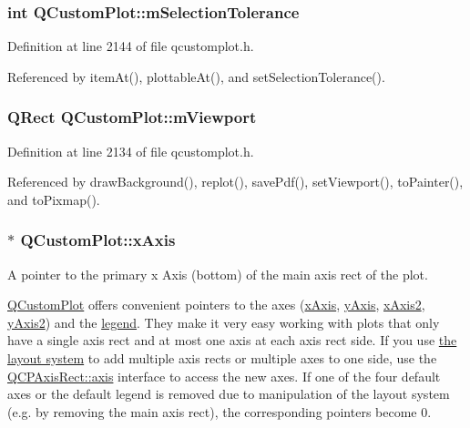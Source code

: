 \subsubsection[{m\+Selection\+Tolerance}]{\setlength{\rightskip}{0pt plus 5cm}int Q\+Custom\+Plot\+::m\+Selection\+Tolerance\hspace{0.3cm}{\ttfamily [protected]}}\label{class_q_custom_plot_abc36e12dd0482117ad810a800c847722}


Definition at line 2144 of file qcustomplot.\+h.



Referenced by item\+At(), plottable\+At(), and set\+Selection\+Tolerance().

\hypertarget{class_q_custom_plot_ac0a7c38a715526c257cff95774f83ab6}{}
\subsubsection[{m\+Viewport}]{\setlength{\rightskip}{0pt plus 5cm}Q\+Rect Q\+Custom\+Plot\+::m\+Viewport\hspace{0.3cm}{\ttfamily [protected]}}\label{class_q_custom_plot_ac0a7c38a715526c257cff95774f83ab6}


Definition at line 2134 of file qcustomplot.\+h.



Referenced by draw\+Background(), replot(), save\+Pdf(), set\+Viewport(), to\+Painter(), and to\+Pixmap().

\hypertarget{class_q_custom_plot_a9a79cd0158a4c7f30cbc702f0fd800e4}{}
\subsubsection[{x\+Axis}]{ $\ast$ Q\+Custom\+Plot\+::x\+Axis}\label{class_q_custom_plot_a9a79cd0158a4c7f30cbc702f0fd800e4}
A pointer to the primary x Axis (bottom) of the main axis rect of the plot.

\hyperlink{class_q_custom_plot}{Q\+Custom\+Plot} offers convenient pointers to the axes (\hyperlink{class_q_custom_plot_a9a79cd0158a4c7f30cbc702f0fd800e4}{x\+Axis}, \hyperlink{class_q_custom_plot_af6fea5679725b152c14facd920b19367}{y\+Axis}, \hyperlink{class_q_custom_plot_ada41599f22cad901c030f3dcbdd82fd9}{x\+Axis2}, \hyperlink{class_q_custom_plot_af13fdc5bce7d0fabd640f13ba805c0b7}{y\+Axis2}) and the \hyperlink{class_q_custom_plot_a4eadcd237dc6a09938b68b16877fa6af}{legend}. They make it very easy working with plots that only have a single axis rect and at most one axis at each axis rect side. If you use \hyperlink{}{the layout system} to add multiple axis rects or multiple axes to one side, use the \hyperlink{class_q_c_p_axis_rect_a560de44e47a4af0f86c59102a094b1e4}{Q\+C\+P\+Axis\+Rect\+::axis} interface to access the new axes. If one of the four default axes or the default legend is removed due to manipulation of the layout system (e.\+g. by removing the main axis rect), the corresponding pointers become 0. 

